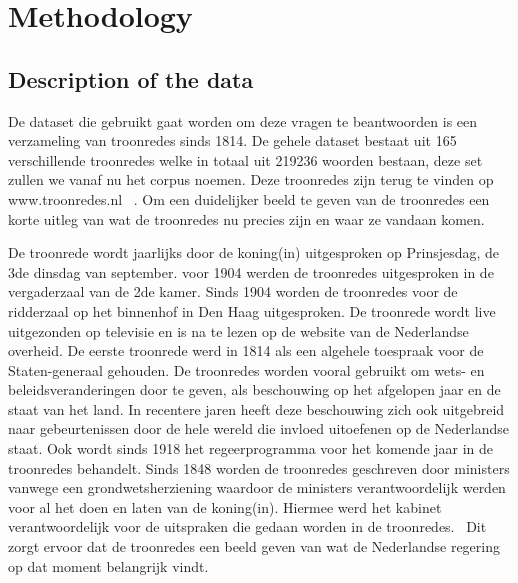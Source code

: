 \section{Methodology}
\label{sec:meth}


\subsection{Description of the data}
De dataset die gebruikt gaat worden om deze vragen te beantwoorden is een verzameling van troonredes sinds 1814. De gehele dataset bestaat uit 165 verschillende troonredes welke in totaal uit 219236 woorden bestaan, deze set zullen we vanaf nu het corpus noemen. Deze troonredes zijn terug te vinden op www.troonredes.nl~\citep{troonredes} . Om een duidelijker beeld te geven van de troonredes een korte uitleg van wat de troonredes nu precies zijn en waar ze vandaan komen. 

De troonrede wordt jaarlijks door de koning(in) uitgesproken op Prinsjesdag, de 3de dinsdag van september. voor 1904 werden de troonredes uitgesproken in de vergaderzaal van de 2de kamer. Sinds 1904 worden de troonredes voor de ridderzaal op het binnenhof in Den Haag uitgesproken. De troonrede wordt live uitgezonden op televisie en is na te lezen op de website van de Nederlandse overheid. De eerste troonrede werd in 1814 als een algehele toespraak voor de Staten-generaal gehouden. De troonredes worden vooral gebruikt om wets- en beleidsveranderingen door te geven, als beschouwing op het afgelopen jaar en de staat van het land. In recentere jaren heeft deze beschouwing zich ook uitgebreid naar gebeurtenissen door de hele wereld die invloed uitoefenen op de Nederlandse staat. Ook wordt sinds 1918 het regeerprogramma voor het komende jaar in de troonredes behandelt. Sinds 1848 worden de troonredes geschreven door ministers vanwege een grondwetsherziening waardoor de ministers verantwoordelijk werden voor al het doen en laten van de koning(in). Hiermee werd het kabinet verantwoordelijk voor de uitspraken die gedaan worden in de troonredes.~\citep{overheid} Dit zorgt ervoor dat de troonredes een beeld geven van wat de Nederlandse regering op dat moment belangrijk vindt.


